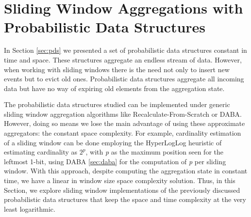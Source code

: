 \section{Sliding Window Aggregations with Probabilistic Data Structures}
In Section \ref{sec:pds} we presented a set of probabilistic data structures constant in time and space. These structures aggregate an endless stream of data. However, when working with sliding windows there is the need not only to insert new events but to evict old ones. Probabilistic data structures aggregate all incoming data but have no way of expiring old elements from the aggregation state. 

The probabilistic data structures studied can be implemented under generic sliding window aggregation algorithms like Recalculate-From-Scratch or DABA. However, doing so means we lose the main advantage of using these approximate aggregators: the constant space complexity. For example, cardinality estimation of a sliding window can be done employing the HyperLogLog heuristic of estimating cardinality as $2^\textit{p}$, with \textit{p} as the maximum position seen for the leftmost 1-bit, using DABA \ref{sec:daba} for the computation of \textit{p} per sliding window. With this approach, despite computing the aggregation state in constant time, we have a linear in window size space complexity solution. Thus, in this Section, we explore sliding window implementations of the previously discussed probabilistic data structures that keep the space and time complexity at the very least logarithmic.


